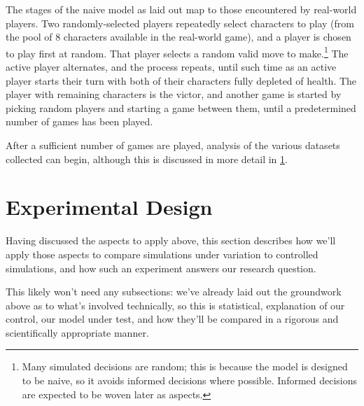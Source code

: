 The stages of the naive model as laid out map to those encountered by real-world
players. Two randomly-selected players repeatedly select characters to play
(from the pool of 8 characters available in the real-world game), and a player
is chosen to play first at random. That player selects a random valid move to
make.\footnote{Many simulated decisions are random; this is because the model is
designed to be naive, so it avoids informed decisions where possible. Informed
decisions are expected to be woven later as aspects.} The active player alternates, and the process repeats, until
such time as an active player starts their turn with both of their characters
fully depleted of health. The player with remaining characters is the victor,
and another game is started by picking random players and starting a game
between them, until a predetermined number of games has been played.

After a sufficient number of games are played, analysis of the various datasets
collected can begin, although this is discussed in more detail in
\cref{sec:optimisation_with_aspects_experimental_design}.




\section{Experimental Design}\label{sec:optimisation_with_aspects_experimental_design}

Having discussed the aspects to apply above, this section describes how we'll
apply those aspects to compare simulations under variation to controlled
simulations, and how such an experiment answers our research question.

This likely won't need any subsections: we've already laid out the groundwork
above as to what's involved technically, so this is statistical, explanation of
our control, our model under test, and how they'll be compared in a rigorous and
scientifically appropriate manner.

